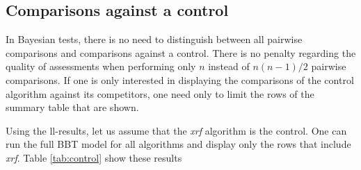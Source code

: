 \documentclass[twoside,11pt,preprint]{article}
\begin{document}
\hypertarget{comparisons-against-a-control}{%
\subsection{\texorpdfstring{Comparisons against a control \label{sec:control}}{Comparisons against a control }}\label{comparisons-against-a-control}}

In Bayesian tests, there is no need to distinguish between all
pairwise comparisons and comparisons against a control. There is no
penalty regarding the quality of assessments when performing only \(n\)
instead of \(n(n-1)/2\) pairwise comparisons. If one is only interested
in displaying the comparisons of the control algorithm against its
competitors, one need only to limit the rows of the summary table that
are shown.

Using the ll-results, let us assume that the \emph{xrf} algorithm is the control. One can run the full BBT model for all algorithms and display only the rows that include \emph{xrf}. Table \ref{tab:control} show these results
\end{document}
